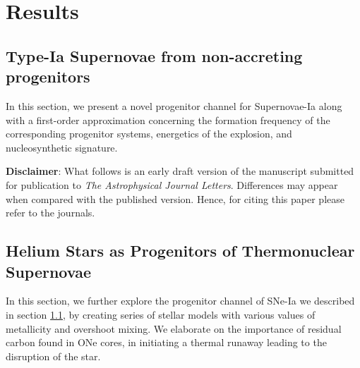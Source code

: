 \documentclass[../../main/thesis_msc.tex]{subfiles}
\begin{document}
	\chapter{Results}
	
	
	
	
	
	
	\section{Type-Ia Supernovae from non-accreting progenitors}\label{sec:results1}
	
	
		\vspace{3cm}
		
		 In this section, we present a novel progenitor channel for Supernovae-Ia along with a first-order approximation concerning the formation frequency of the corresponding progenitor systems, energetics of the explosion, and nucleosynthetic signature.
		
		\newline
		\noindent \textbf{Disclaimer}: What follows is an early draft version of the manuscript submitted for publication to \textit{The Astrophysical Journal Letters}. Differences may appear when compared with the published version. Hence, for citing this paper please refer to the journals.
		
		\newpage
	
		
            
           
            
     \thispagestyle{empty}
     \null\newpage
     
     \section{Helium Stars as Progenitors of Thermonuclear Supernovae}\label{sec:results2}
     
     
    	 \vspace{3cm}
		
		In this section, we further explore the progenitor channel of SNe-Ia we described in section \ref{sec:results1}, by creating series of stellar models with various values of metallicity and overshoot mixing. We elaborate on the importance of residual carbon found in ONe cores, in initiating a thermal runaway leading to the disruption of the star.
		
\end{document}
